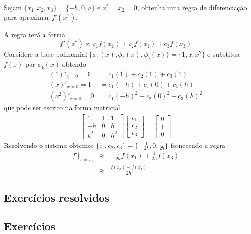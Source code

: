 \begin{ex}
Sejam $\{x_1, x_2, x_3\}=\{-h, 0, h\}$ e $x^*=x_2=0$, obtenha uma regra de diferenciação para aproximar $f'(x^*)$.
\end{ex}
\begin{sol}
A regra terá a forma
\begin{equation*}
  f'(x^*) \approx c_1f(x_1)+c_2f(x_2)+c_3f(x_3)
\end{equation*}
Considere a base polinomial $\{\phi _1(x), \phi _2(x), \phi _3(x)\} = \{1, x, x^2\}$ e substitua $f(x)$ por $\phi _k(x)$ obtendo
\begin{eqnarray}
    (1)'_{x=0} = 0  &=  c_1(1)   +c_2(1)  + c_3 (1) \\
    (x)'_{x=0} = 1  &=  c_1(-h)  +c_2(0)  + c_3 (h)\\
  (x^2)'_{x=0} = 0  &=  c_1(-h)^2+c_2(0)^2+ c_3 (h)^2
\end{eqnarray}
que pode ser escrito na forma matricial
\begin{eqnarray}
  \begin{bmatrix}
    1   &  1    & 1  \\
    -h  &  0    & h  \\
    h^2 &  0    & h^2    
  \end{bmatrix}
  \begin{bmatrix}
    c_1 \\ c_2\\ c_3
  \end{bmatrix}
=
\begin{bmatrix}
  0  \\ 1 \\ 0
\end{bmatrix}
\end{eqnarray}
Resolvendo o sistema obtemos $\{c_1, c_2, c_3\}=\{-\frac{1}{2h}, 0, \frac{1}{2h}\}$ fornecendo a regra
\begin{eqnarray}
  f'|_{x=x_1}& \approx &  -\frac{1}{2h}f(x_1) + \frac{1}{2h}f(x_3)\\
             & \approx &\frac{f(x_3)-f(x_1)}{2h}
\end{eqnarray}
\end{sol}

\subsection*{Exercícios resolvidos}

\emconstrucao

\subsection*{Exercícios}

